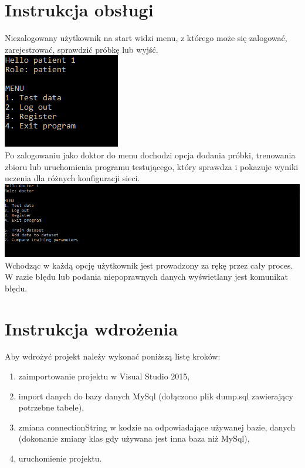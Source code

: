 \documentclass[12pt,a4paper]{article}
\begin{document}
	
\section*{Instrukcja obsługi}
Niezalogowany użytkownik na start widzi menu, z którego może się zalogować, zarejestrować, sprawdzić próbkę lub wyjść.\\
\includegraphics[width=0.5\linewidth]{media/menuPatient}\\
Po zalogowaniu jako doktor do menu dochodzi opcja dodania próbki, trenowania zbioru lub uruchomienia programu testującego, który sprawdza i pokazuje wyniki uczenia dla różnych konfiguracji sieci.\\
\includegraphics[width=0.9\linewidth]{media/menuDoctor}\\
Wchodząc w każdą opcję użytkownik jest prowadzony za rękę przez cały proces. W razie błędu lub podania niepoprawnych danych wyświetlany jest komunikat błędu.
	
\section*{Instrukcja wdrożenia}

	Aby wdrożyć projekt należy wykonać poniższą listę kroków:
	
	\begin{enumerate}
		\item zaimportowanie projektu w Visual Studio 2015,
		\item import danych do bazy danych MySql (dołączono plik dump.sql zawierający potrzebne tabele),
		\item zmiana connectionString w kodzie na odpowiadające używanej bazie,
		danych (dokonanie zmiany klas gdy używana jest inna baza niż MySql),
		\item uruchomienie projektu.
	\end{enumerate}
	
\end{document}
